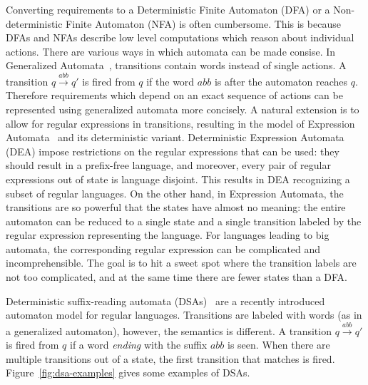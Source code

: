 \documentclass[runningheads,envcountsame]{llncs}
\newcommand{\xra}{\xrightarrow}
\begin{document}

  Converting requirements to a Deterministic Finite Automaton (DFA) or a Non-deterministic Finite Automaton (NFA) is often cumbersome. This is because DFAs and NFAs describe low level computations which reason about individual actions. There are various ways in which automata can be made consise. In Generalized Automata~\cite{DBLP:books/lib/Eilenberg76,GIAMMARRESI1999191}, transitions contain words instead of single actions. A transition $q \xra{abb} q'$ is fired from $q$ if the word $abb$ is after the automaton reaches $q$. Therefore requirements which depend on an exact sequence of actions can be represented using generalized automata more concisely. A natural extension is to allow for regular expressions in transitions, resulting in the model of Expression Automata~\cite{10.1007/978-3-540-30500-2_15} and its deterministic variant. Deterministic Expression Automata (DEA) impose restrictions on the regular expressions that can be used: they should result in a prefix-free language, and moreover, every pair of regular expressions out of state is language disjoint. This results in DEA recognizing a subset of regular languages. On the other hand, in Expression Automata, the transitions are so powerful that the states have almost no meaning: the entire automaton can be reduced to a single state and a single transition labeled by the regular expression representing the language. For languages leading to big automata, the corresponding regular expression can be complicated and incomprehensible. The goal is to hit a sweet spot where the transition labels are not too complicated, and at the same time there are fewer states than a DFA. 

   

  Deterministic suffix-reading automata (DSAs)~\cite{DBLP:journals/corr/abs-2410-22761} are a recently introduced automaton model for regular languages. Transitions are  labeled with words (as in a generalized automaton), however, the semantics is different. A transition $q \xra{abb} q'$ is fired from $q$ if a word \emph{ending} with the suffix $abb$ is seen. When there are multiple transitions out of a state, the first transition that matches is fired. Figure~\ref{fig:dsa-examples} gives some examples of DSAs.
\end{document}
